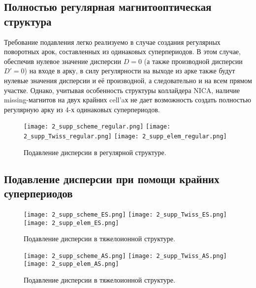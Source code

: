 \subsection{Полностью регулярная магнитооптическая структура}\label{subsec:transition_variation/disp_supperssion/regular}

\par Требование подавления легко реализуемо в случае создания регулярных поворотных арок, составленных из одинаковых суперпериодов. В этом случае, обеспечив нулевое значение дисперсии $D=0$ (а также производной дисперсии $D\prime=0$) на входе в арку, в силу регулярности на выходе из арке также будут нулевые значения дисперсии и её производной, а следовательно и на всем прямом участке. Однако, учитывая особенность структуры коллайдера NICA, наличие missing-магнитов на двух крайних cell’aх не дает возможность создать полностью регулярную арку из 4-х одинаковых суперпериодов.

\begin{figure} [h!]
   \center
   \texttt{[image: 2\_supp\_scheme\_regular.png]}
   \texttt{[image: 2\_supp\_Twiss\_regular.png]}
   \texttt{[image: 2\_supp\_elem\_regular.png]}
   \caption{Подавление дисперсии в регулярной структуре.}
   \label{fig:2_disp_supp_full_regular}
\end{figure}
	
\subsection{Подавление дисперсии при помощи крайних суперпериодов}\label{subsec:transition_variation/disp_supperssion/ES}

\par	
\begin{figure} [h!]
   \center
   \texttt{[image: 2\_supp\_scheme\_ES.png]}
   \texttt{[image: 2\_supp\_Twiss\_ES.png]}
   \texttt{[image: 2\_supp\_elem\_ES.png]}
   \caption{Подавление дисперсии в тяжелоионной структуре.}
   \label{fig:2_disp_supp_ES}
\end{figure}	

\begin{figure} [h!]
   \center
   \texttt{[image: 2\_supp\_scheme\_AS.png]}
   \texttt{[image: 2\_supp\_Twiss\_AS.png]}
   \texttt{[image: 2\_supp\_elem\_AS.png]}
   \caption{Подавление дисперсии в тяжелоионной структуре.}
   \label{fig:2_disp_supp_AS}
\end{figure}	


